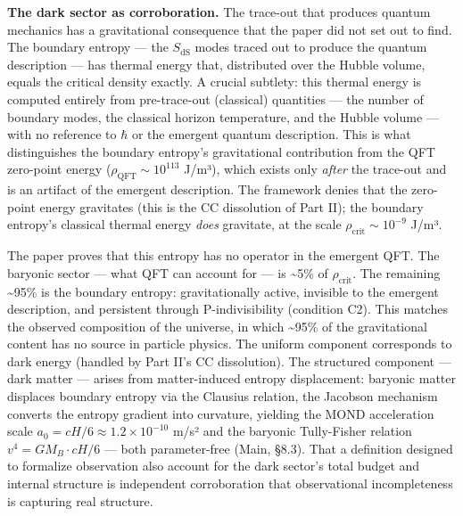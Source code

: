 \documentclass[
]{article}
\begin{document}
\textbf{The dark sector as corroboration.} The trace-out that produces
quantum mechanics has a gravitational consequence that the paper did not
set out to find. The boundary entropy --- the \(S_{\text{dS}}\) modes
traced out to produce the quantum description --- has thermal energy
that, distributed over the Hubble volume, equals the critical density
exactly. A crucial subtlety: this thermal energy is computed entirely
from pre-trace-out (classical) quantities --- the number of boundary
modes, the classical horizon temperature, and the Hubble volume --- with
no reference to \(\hbar\) or the emergent quantum description. This is
what distinguishes the boundary entropy's gravitational contribution
from the QFT zero-point energy (\(\rho_{\text{QFT}} \sim 10^{113}\)
J/m³), which exists only \emph{after} the trace-out and is an artifact
of the emergent description. The framework denies that the zero-point
energy gravitates (this is the CC dissolution of Part II); the boundary
entropy's classical thermal energy \emph{does} gravitate, at the scale
\(\rho_{\text{crit}} \sim 10^{-9}\) J/m³.

The paper proves that this entropy has no operator in the emergent QFT.
The baryonic sector --- what QFT can account for --- is
\textasciitilde5\% of \(\rho_{\text{crit}}\). The remaining
\textasciitilde95\% is the boundary entropy: gravitationally active,
invisible to the emergent description, and persistent through
P-indivisibility (condition C2). This matches the observed composition
of the universe, in which \textasciitilde95\% of the gravitational
content has no source in particle physics. The uniform component
corresponds to dark energy (handled by Part II's CC dissolution). The
structured component --- dark matter --- arises from matter-induced
entropy displacement: baryonic matter displaces boundary entropy via the
Clausius relation, the Jacobson mechanism converts the entropy gradient
into curvature, yielding the MOND acceleration scale
\(a_0 = cH/6 \approx 1.2 \times 10^{-10}\) m/s² and the baryonic
Tully-Fisher relation \(v^4 = GM_B \cdot cH/6\) --- both parameter-free
(Main, §8.3). That a definition designed to formalize observation also
account for the dark sector's total budget and internal structure is
independent corroboration that observational incompleteness is capturing
real structure.
\end{document}
